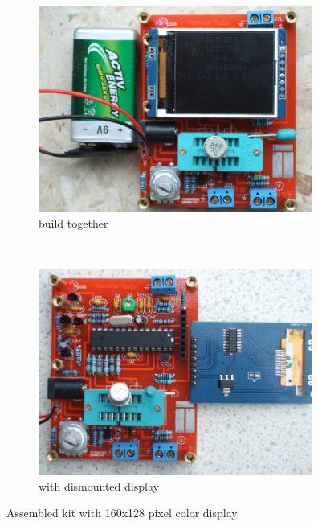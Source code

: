 \begin{figure}[H]
  \begin{subfigure}[b]{9cm}
    \centering
    \includegraphics[width=9cm]{../PNG/Kit_Color_a.jpg}
    \caption{build together}
  \end{subfigure}
  ~
  \begin{subfigure}[b]{9cm}
    \centering
    \includegraphics[width=9cm]{../PNG/Kit_Color_b.jpg}
    \caption{with dismounted display}
  \end{subfigure}
  \caption{Assembled kit with 160x128 pixel color display}
  \label{fig:Kit_color}
\end{figure}

